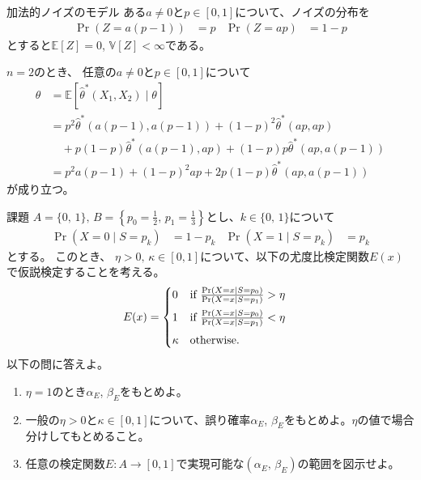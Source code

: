 \documentclass[lualatex,handout]{beamer}
\newcommand{\expt}[1]{\mathbb{E}\left[#1\right]}
\newcommand{\var}[1]{\mathbb{V}\left[#1\right]}
\theoremstyle{definition}
\begin{document}
\begin{frame}{加法的ノイズのモデル}
\small
ある$a\ne 0$と$p\in[0,1]$について、ノイズの分布を
\begin{align*}
\Pr(Z = a(p-1)) &= p&
\Pr(Z = ap) &= 1-p
\end{align*}
とすると$\expt{Z}=0$, $\var{Z}<\infty$である。

$n=2$のとき、
任意の$a\ne 0$と$p\in[0,1]$について
\begin{align*}
\theta&= \expt{\widehat{\theta}^*(X_1,X_2)\mid\theta}\\
 &= p^2 \widehat{\theta}^*(a(p-1),a(p-1)) + (1-p)^2 \widehat{\theta}^*(ap, ap)\\
&\quad + p(1-p) \widehat{\theta}^*(a(p-1), ap) + (1-p)p\widehat{\theta}^*(ap, a(p-1))\\
 &= p^2 a(p-1) + (1-p)^2 ap + 2p(1-p) \widehat{\theta}^*(ap, a(p-1))
\end{align*}
が成り立つ。
\end{frame}
\fi

\begin{frame}{課題}
\small
$A=\{0,\,1\},\, B=\left\{p_0=\frac12,\,p_1=\frac13\right\}$とし、$k\in\{0,\,1\}$について
\begin{align*}
\Pr(X = 0 \mid S = p_k) &= 1-p_k&
\Pr(X = 1 \mid S = p_k) &= p_k
\end{align*}
とする。
このとき、 $\eta> 0,\,\kappa\in[0,1]$について、以下の尤度比検定関数$E(x)$で仮説検定することを考える。
\begin{align*}
E(x)&=
\begin{cases}
\vspace{.5em}
0&\text{if } \frac{\Pr(X = x\mid S = p_0)}{\Pr(X = x\mid S = p_1)} > \eta\\\vspace{.5em}
1&\text{if } \frac{\Pr(X = x\mid S = p_0)}{\Pr(X = x\mid S = p_1)} < \eta\\
\kappa&\text{otherwise.}
\end{cases}
\end{align*}
以下の問に答えよ。
\begin{enumerate}
\setlength{\itemsep}{1em}
\item $\eta=1$のとき$\alpha_E$, $\beta_E$をもとめよ。
\item 一般の$\eta>0$と$\kappa\in[0,1]$について、誤り確率$\alpha_E$, $\beta_E$をもとめよ。$\eta$の値で場合分けしてもとめること。
\item 任意の検定関数$E\colon A\to[0,1]$で実現可能な$(\alpha_E,\, \beta_E)$の範囲を図示せよ。
\end{enumerate}
\end{frame}
\end{document}
